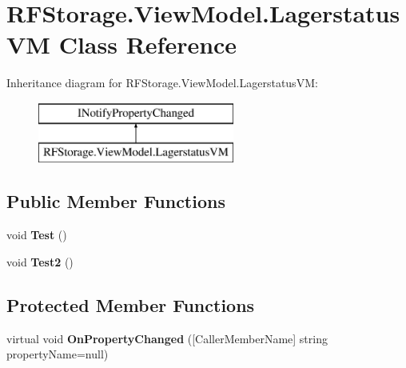\hypertarget{class_r_f_storage_1_1_view_model_1_1_lagerstatus_v_m}{}\section{R\+F\+Storage.\+View\+Model.\+Lagerstatus\+VM Class Reference}
\label{class_r_f_storage_1_1_view_model_1_1_lagerstatus_v_m}
Inheritance diagram for R\+F\+Storage.\+View\+Model.\+Lagerstatus\+VM\+:\begin{figure}[H]
\begin{center}
\leavevmode
\includegraphics[height=2.000000cm]{class_r_f_storage_1_1_view_model_1_1_lagerstatus_v_m}
\end{center}
\end{figure}
\subsection*{Public Member Functions}
\begin{DoxyCompactItemize}
\item 
\mbox{\label{class_r_f_storage_1_1_view_model_1_1_lagerstatus_v_m_a53b48537022d350bc85bdf0e62a8865d}} 
void {\bfseries Test} ()
\item 
\mbox{\label{class_r_f_storage_1_1_view_model_1_1_lagerstatus_v_m_a36941d14b908d21dd6940fc28a675690}} 
void {\bfseries Test2} ()
\end{DoxyCompactItemize}
\subsection*{Protected Member Functions}
\begin{DoxyCompactItemize}
\item 
\mbox{\label{class_r_f_storage_1_1_view_model_1_1_lagerstatus_v_m_af931ec8372de420c256ba042b98527d1}} 
virtual void {\bfseries On\+Property\+Changed} (\mbox{[}Caller\+Member\+Name\mbox{]} string property\+Name=null)
\end{DoxyCompactItemize}
